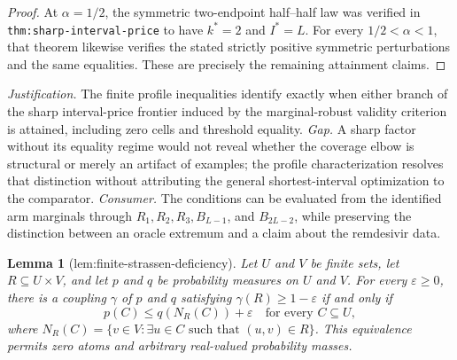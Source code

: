 \documentclass{article}
\newtheorem{lemma}{Lemma}
\begin{document}
\begin{proof}
At \(\alpha=1/2\), the symmetric two-endpoint half--half law was verified in \texttt{thm:sharp-interval-price} to have \(k^*=2\) and \(I^*=L\).  For every \(1/2<\alpha<1\), that theorem likewise verifies the stated strictly positive symmetric perturbations and the same equalities.  These are precisely the remaining attainment claims.
\end{proof}
\par\smallskip\noindent \textit{Justification.} The finite profile inequalities identify exactly when either branch of the sharp interval-price frontier induced by the marginal-robust validity criterion is attained, including zero cells and threshold equality. \textit{Gap.} A sharp factor without its equality regime would not reveal whether the coverage elbow is structural or merely an artifact of examples; the profile characterization resolves that distinction without attributing the general shortest-interval optimization to the comparator. \textit{Consumer.} The conditions can be evaluated from the identified arm marginals through \(R_1,R_2,R_3,B_{L-1}\), and \(B_{2L-2}\), while preserving the distinction between an oracle extremum and a claim about the remdesivir data.

\begin{lemma}[lem:finite-strassen-deficiency]\label{lem:finite-strassen-deficiency}
Let \(U\) and \(V\) be finite sets, let \(R\subseteq U\times V\), and let \(p\) and \(q\) be probability measures on \(U\) and \(V\).  For every \(\varepsilon\geq0\), there is a coupling \(\gamma\) of \(p\) and \(q\) satisfying \(\gamma(R)\geq1-\varepsilon\) if and only if
\[
p(C)\leq q(N_R(C))+\varepsilon
\quad\text{for every }C\subseteq U,
\]
where \(N_R(C)=\{v\in V:\exists u\in C\text{ such that }(u,v)\in R\}\).  This equivalence permits zero atoms and arbitrary real-valued probability masses.
\end{lemma}
\end{document}
